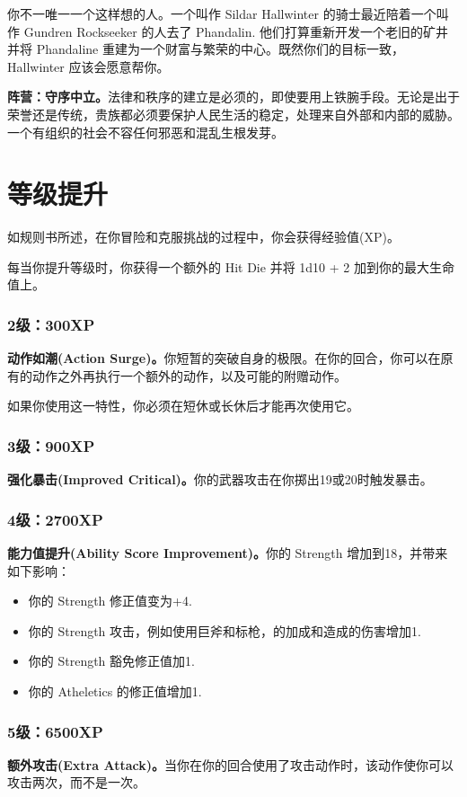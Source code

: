 \documentclass[letterpaper,twocolumn,openany,nodeprecatedcode]{dndbook}
\begin{document}
你不一唯一一个这样想的人。一个叫作 Sildar Hallwinter 的骑士最近陪着一个叫作 Gundren Rockseeker 的人去了 Phandalin. 他们打算重新开发一个老旧的矿井并将 Phandaline 重建为一个财富与繁荣的中心。既然你们的目标一致， Hallwinter 应该会愿意帮你。

\textbf{阵营：守序中立。}法律和秩序的建立是必须的，即使要用上铁腕手段。无论是出于荣誉还是传统，贵族都必须要保护人民生活的稳定，处理来自外部和内部的威胁。一个有组织的社会不容任何邪恶和混乱生根发芽。

\section{等级提升}

如规则书所述，在你冒险和克服挑战的过程中，你会获得经验值(XP)。

每当你提升等级时，你获得一个额外的 Hit Die 并将 1d10 + 2 加到你的最大生命值上。

\subsubsection{2级：300XP}

\textbf{动作如潮(Action Surge)。}你短暂的突破自身的极限。在你的回合，你可以在原有的动作之外再执行一个额外的动作，以及可能的附赠动作。

如果你使用这一特性，你必须在短休或长休后才能再次使用它。

\subsubsection{3级：900XP}
\textbf{强化暴击(Improved Critical)。}你的武器攻击在你掷出19或20时触发暴击。

\subsubsection{4级：2700XP}
\textbf{能力值提升(Ability Score Improvement)。}你的 Strength 增加到18，并带来如下影响：
\begin{itemize}
\item 你的 Strength 修正值变为+4.
\item 你的 Strength 攻击，例如使用巨斧和标枪，的加成和造成的伤害增加1.
\item 你的 Strength 豁免修正值加1.
\item 你的 Atheletics 的修正值增加1.
\end{itemize}

\subsubsection{5级：6500XP}
\textbf{额外攻击(Extra Attack)。}当你在你的回合使用了攻击动作时，该动作使你可以攻击两次，而不是一次。
\end{document}
